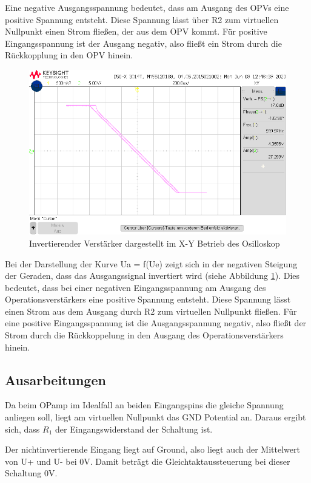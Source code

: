 Eine negative Ausgangsspannung bedeutet, dass am Ausgang des OPVs eine positive Spannung entsteht. Diese Spannung lässt über R2 zum virtuellen Nullpunkt einen Strom fließen, der aus dem OPV kommt. Für positive Eingangsspannung ist der Ausgang negativ, also fließt ein Strom durch die Rückkopplung in den OPV hinein.
\begin{figure}[H]
    \centering
    \includegraphics[width=\costumPicWidth]{Lab_1/Messungen/inv_verst/scope_48.png}
    \caption{Invertierender Verstärker dargestellt im X-Y Betrieb des Osilloskop}
    \label{fig:inv_verst_xy}
\end{figure}
Bei der Darstellung der Kurve Ua = f(Ue) zeigt sich in der negativen Steigung der Geraden, dass das Ausgangssignal invertiert wird (siehe Abbildung \ref{fig:inv_verst_xy}). Dies bedeutet, dass bei einer negativen Eingangsspannung am Ausgang des Operationsverstärkers eine positive Spannung entsteht. Diese Spannung lässt einen Strom aus dem Ausgang durch R2 zum virtuellen Nullpunkt fließen. Für eine positive Eingangsspannung ist die Ausgangsspannung negativ, also fließt der Strom durch die Rückkoppelung in den Ausgang des Operationsverstärkers hinein.

\subsection{Ausarbeitungen}
Da beim OPamp im Idealfall an beiden Eingangspins die gleiche Spannung anliegen soll, liegt am virtuellen Nullpunkt das GND Potential an. Daraus ergibt sich, dass $R_1$ der Eingangswiderstand der Schaltung ist.

Der nichtinvertierende Eingang liegt auf Ground, also liegt auch der Mittelwert von U+ und U- bei 0V. Damit beträgt die Gleichtaktaussteuerung bei dieser Schaltung 0V.

